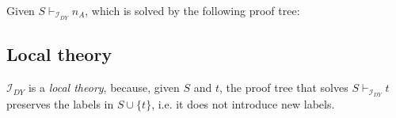     \noindent
    Given $S \vdash_{\mathcal{I}_{DY}} n_A$, which is solved by the following proof tree:

    \begin{prooftree}
         
    \end{prooftree}

\subsection{Local theory}
$\mathcal{I}_{DY}$ is a \emph{local theory}, because, given $S$ and $t$, the proof tree that solves $S \vdash_{\mathcal{I}_{DY}} t$ preserves the labels in $S \cup \{t\}$, i.e. it does not introduce new labels.
